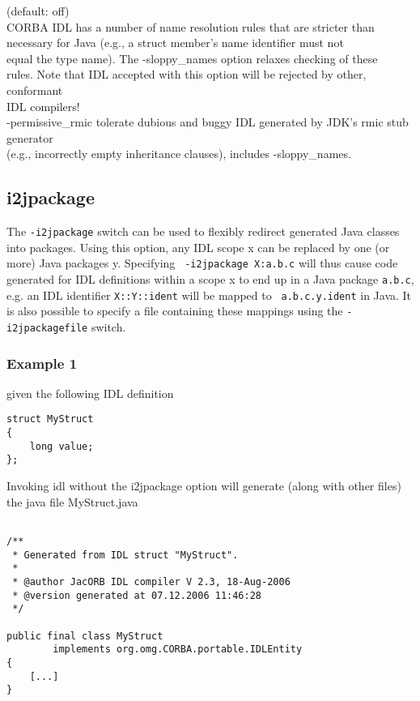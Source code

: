 \begin{tabbing}
(default: off)\\
\> \> CORBA IDL has a number of  name resolution rules that are
stricter than\\
\> \> necessary for Java (e.g., a struct member's name identifier must
not \\
\> \> equal the type name). The -sloppy\_names option relaxes checking of
these \\
\> \>  rules. Note that IDL accepted with this option will be rejected
by other, conformant  \\
\> \> IDL compilers!\\
\> -permissive\_rmic  \>  tolerate dubious and buggy IDL generated by
JDK's rmic stub generator\\
\> \> (e.g., incorrectly empty inheritance clauses), includes -sloppy\_names.\\
\end{tabbing}

\subsection*{i2jpackage}
The {\tt -i2jpackage} switch can be used to flexibly redirect
generated Java classes into packages. Using this option, any IDL scope
x can be replaced by one (or more) Java packages y. Specifying {\tt
  -i2jpackage X:a.b.c} will thus cause code generated for IDL
definitions within a scope x to end up in a Java package {\tt a.b.c},
e.g. an IDL identifier {\tt X::Y::ident} will be mapped to {\tt
  a.b.c.y.ident} in Java. It is also possible to specify a file
containing these mappings using the {\tt -i2jpackagefile} switch.

\subsubsection{Example 1}

given the following IDL definition
\begin{verbatim}
struct MyStruct
{
    long value;
};
\end{verbatim}
Invoking idl without the i2jpackage option will generate (along with other
files) the java file MyStruct.java
\begin{verbatim}

/**
 * Generated from IDL struct "MyStruct".
 *
 * @author JacORB IDL compiler V 2.3, 18-Aug-2006
 * @version generated at 07.12.2006 11:46:28
 */

public final class MyStruct
        implements org.omg.CORBA.portable.IDLEntity
{
    [...]
}
\end{verbatim}

